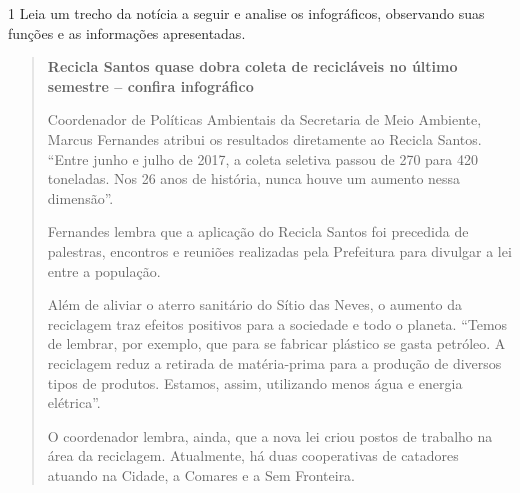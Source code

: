 

\num{1} Leia um trecho da notícia a seguir e analise os infográficos,
observando suas funções e as informações apresentadas.

\begin{quote}
\textbf{Recicla Santos quase dobra coleta de recicláveis no último
semestre -- confira infográfico}


Coordenador de Políticas Ambientais da Secretaria de Meio Ambiente,
Marcus Fernandes atribui os resultados diretamente ao Recicla Santos.
``Entre junho e julho de 2017, a coleta seletiva passou de 270 para 420
toneladas. Nos 26 anos de história, nunca houve um aumento nessa
dimensão''.

Fernandes lembra que a aplicação do Recicla Santos foi precedida de
palestras, encontros e reuniões realizadas pela Prefeitura para divulgar
a lei entre a população.

Além de aliviar o aterro sanitário do Sítio das Neves, o aumento da
reciclagem traz efeitos positivos para a sociedade e todo o planeta.
``Temos de lembrar, por exemplo, que para se fabricar plástico se gasta
petróleo. A reciclagem reduz a retirada de matéria-prima para a produção
de diversos tipos de produtos. Estamos, assim, utilizando menos água e
energia elétrica''.

O coordenador lembra, ainda, que a nova lei criou postos de trabalho na
área da reciclagem. Atualmente, há duas cooperativas de catadores
atuando na Cidade, a Comares e a Sem Fronteira.


\end{quote}

